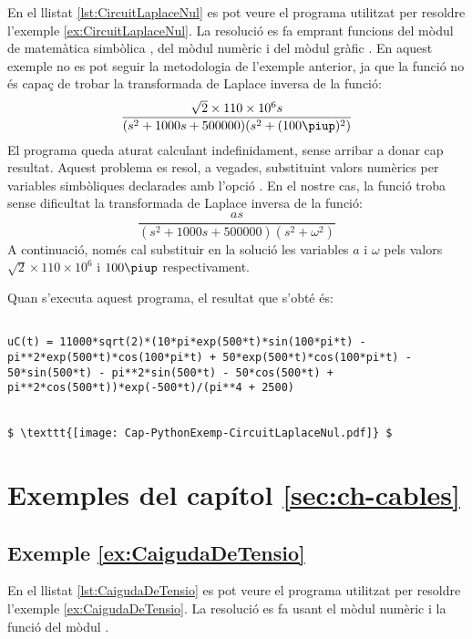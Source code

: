 En el llistat \vref{lst:CircuitLaplaceNul} es pot veure el programa utilitzat per resoldre l'exemple \vref{ex:CircuitLaplaceNul}. La resolució es fa emprant funcions del mòdul de matemàtica simbòlica , del mòdul numèric  i del mòdul gràfic  . 
En aquest exemple no es pot seguir la metodologia de l'exemple anterior, ja que la funció   no és capaç de trobar la transformada de Laplace inversa de la funció: 
\[
\frac{\sqrt{2}\times 110\times 10^6 s}{(s^2 + 1000 s + 500000)(s^2 + (100\piup)^2)}
\]
El programa queda aturat calculant indefinidament, sense arribar a donar cap resultat.  Aquest problema es resol, a vegades, substituint valors numèrics per variables simbòliques declarades amb l'opció . En el nostre cas, la funció  troba sense dificultat la transformada de Laplace inversa de la funció:
\[
\frac{a s}{(s^2 + 1000 s + 500000)(s^2 + \omega^2)}
\]
A continuació, només cal substituir en la solució les variables $a$ i $\omega$ pels valors $\sqrt{2}\times 110\times 10^6$ i $100\piup$ respectivament.





Quan s'executa aquest programa, el resultat que s'obté és:
\lstset{
	language=,
	numbers=none,
	frame=none
}
\begin{lstlisting}[mathescape=true]
	
uC(t) = 11000*sqrt(2)*(10*pi*exp(500*t)*sin(100*pi*t) - pi**2*exp(500*t)*cos(100*pi*t) + 50*exp(500*t)*cos(100*pi*t) - 50*sin(500*t) - pi**2*sin(500*t) - 50*cos(500*t) + pi**2*cos(500*t))*exp(-500*t)/(pi**4 + 2500)


$ \texttt{[image: Cap-PythonExemp-CircuitLaplaceNul.pdf]} $
\end{lstlisting} 



\section{Exemples del capítol \ref*{sec:ch-cables}}

\hypertarget{exemple:CaigudaDeTensio}{\subsection{Exemple \ref*{ex:CaigudaDeTensio} \CaigudaDeTensio}}
En el llistat \vref{lst:CaigudaDeTensio} es pot veure el programa utilitzat per resoldre l'exemple \vref{ex:CaigudaDeTensio}. La resolució es fa usant el mòdul numèric  i  la funció  del mòdul .


